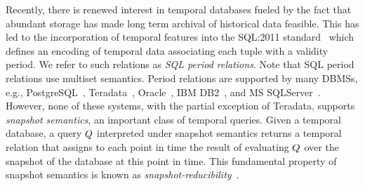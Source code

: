 Recently, there
is renewed interest in temporal databases fueled by the fact that abundant
storage has made long term archival of historical data feasible. This
has led to the incorporation of temporal features into the SQL:2011
standard~\cite{KulkarniM12}
which
defines an encoding of temporal data associating each tuple with a validity period. We refer to such relations as  \textit{SQL period
  relations}. %
Note that SQL period relations use multiset semantics. %
Period relations are supported by
many DBMSs, e.g., PostgreSQL~\cite{PGSQLRT},
Teradata~\cite{teradata1510}, Oracle~\cite{ORA16}, IBM
DB2~\cite{SaraccoNG2012}, and MS SQLServer~\cite{MSSQL16}. However,
none of these systems, with the partial exception of Teradata,
supports \textit{snapshot
  semantics}, an important class of
temporal queries.
%
Given a temporal database, a  query $Q$ interpreted
under snapshot semantics returns a temporal relation that assigns to each point
in time the result of evaluating $Q$ over the snapshot of the database at
this point in time.  This fundamental %
property of snapshot semantics is known as
\emph{snapshot-reducibility}~\cite{LorentzosM97,SJ95}.


